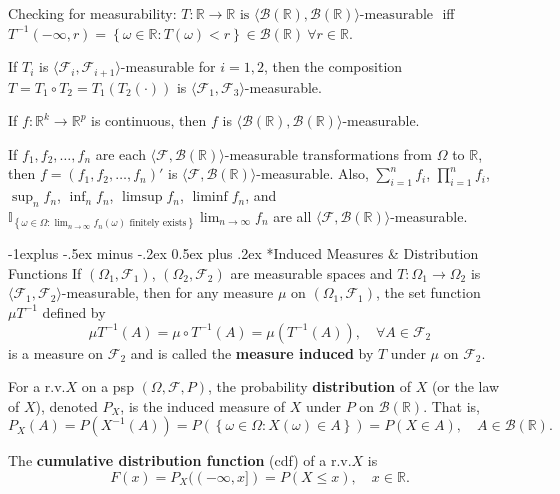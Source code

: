 \documentclass[paper=letter,fontsize=3mm]{scrartcl}
\makeatletter
\newcommand{\Borel}{\mathcal{B}}
\newcommand{\R}{\mathbb{R}}
\newcommand\indicate[1]{\mathbb{I}_{ #1 }}
\newcommand\set[1]{\left\{ #1 \right\}}
\renewcommand{\subsection}{\@startsection{subsection}{2}{0mm}%
                                {-1explus -.5ex minus -.2ex}%
                                {0.5ex plus .2ex}%
                                {\normalfont\normalsize\bfseries}}
\makeatother
\begin{document}
\begin{multicols*}{3}
Checking for measurability: $T: \R \to \R \text{ is } \langle\Borel(\R), \Borel(\R)\rangle\text{-measurable }$ iff $T^{-1}(-\infty, r) = \set{\omega \in \R: T(\omega) < r} \in \Borel(\R) ~\forall r \in \R$. \\\medskip

If $T_i$ is $\langle \mathcal{F}_i, \mathcal{F}_{i+1}\rangle$-measurable for $i = 1,2$, then the composition $T = T_1 \circ T_2 = T_1(T_2(\cdot))$ is $\langle \mathcal{F}_1, \mathcal{F}_3\rangle$-measurable. \\\medskip

If $f: \R^k \to \R^p$ is continuous, then $f$ is $\langle\Borel(\R), \Borel(\R)\rangle$-measurable. \\\medskip

If $f_1, f_2, \dots, f_n$ are each $\langle \mathcal{F},\Borel(\R) \rangle$-measurable transformations from $\Omega$ to $\R$, then $f = (f_1, f_2, \dots, f_n)'$ is $\langle\mathcal{F},\Borel(\R)\rangle$-measurable. Also, $\sum_{i=1}^n f_i$, $\prod_{i=1}^nf_i$, $\sup_n f_n$, $\inf_n f_n$, $\limsup f_n$, $\liminf f_n$, and $\indicate{\set{\omega\in\Omega:\lim_{n\to\infty}f_n(\omega) \text{ finitely exists}}} \lim_{n\to\infty}f_n$ are all $\langle\mathcal{F}, \Borel(\R)\rangle$-measurable. \\\medskip

\subsection*{Induced Measures \& Distribution Functions}
If $(\Omega_1, \mathcal{F}_1)$, $(\Omega_2, \mathcal{F}_2)$ are measurable spaces and $T: \Omega_1 \to \Omega_2$ is $\langle \mathcal{F}_1, \mathcal{F}_2\rangle$-measurable, then for any measure $\mu$ on $(\Omega_1, \mathcal{F}_1)$, the set function $\mu T^{-1}$ defined by
$$\mu T^{-1}(A) = \mu \circ T^{-1}(A) = \mu(T^{-1}(A)), \quad \forall A \in \mathcal{F}_2$$
is a measure on $\mathcal{F}_2$ and is called the \textbf{measure induced} by $T$ under $\mu$ on $\mathcal{F}_2$. \\\medskip

For a r.v.\@ $X$ on a psp $(\Omega, \mathcal{F}, P)$, the probability \textbf{distribution} of $X$ (or the law of $X$), denoted $P_X$,  is the induced measure of $X$ under $P$ on $\Borel(\R)$. That is,
$$P_X(A) = P(X^{-1}(A)) = P(\set{\omega \in \Omega: X(\omega) \in A}) = P(X \in A), \quad A \in \Borel(\R).$$

The \textbf{cumulative distribution function} (cdf) of a r.v.\@ $X$ is
$$F(x) = P_X((-\infty,x]) = P(X \le x), \quad x \in \R.$$


\end{multicols*}
\end{document}
